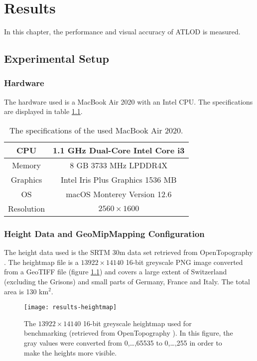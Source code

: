 \chapter{Results}
In this chapter, the performance and visual accuracy of ATLOD is 
measured.

\section{Experimental Setup}
\subsection{Hardware}
The hardware used is a MacBook Air 2020 with an Intel CPU.
The specifications are displayed in table \ref{tbl:specs}.

\begin{table}[H]
  \begin{center}
    \begin{tabular}{ c|c }
      CPU & 1.1 GHz Dual-Core Intel Core i3\\
      \hline
      Memory & 8 GB 3733 MHz LPDDR4X\\
      \hline
      Graphics & Intel Iris Plus Graphics 1536 MB\\
      \hline
      OS & macOS Monterey Version 12.6\\
      \hline
      Resolution & $2560 \times 1600$
    \end{tabular}
  \end{center}
  \caption{The specifications of the used MacBook Air 2020.}\label{tbl:specs}
  \end{table}

\subsection{Height Data and GeoMipMapping Configuration}
The height data used is the SRTM 30m data set retrieved from OpenTopography \cite{srtm2013}. 
The heightmap file
is a $13922 \times 14140$ 16-bit greyscale PNG image converted 
from a GeoTIFF file (figure \ref{fig:results-heightmap}) and covers 
a large extent of Switzerland (excluding the Grisons) and small parts 
of Germany, France and Italy. The total area is 130 km$^2$.


\begin{figure}[H]
  \centering
  \texttt{[image: results-heightmap]}
  \caption{The $13922 \times 14140$ 16-bit greyscale heightmap used for benchmarking (retrieved from OpenTopography \cite{srtm2013}). In this figure, the gray values were converted from 0,\dots,65535 to 0,\dots,255 in order to make the heights more visible.}\label{fig:results-heightmap}
\end{figure}

